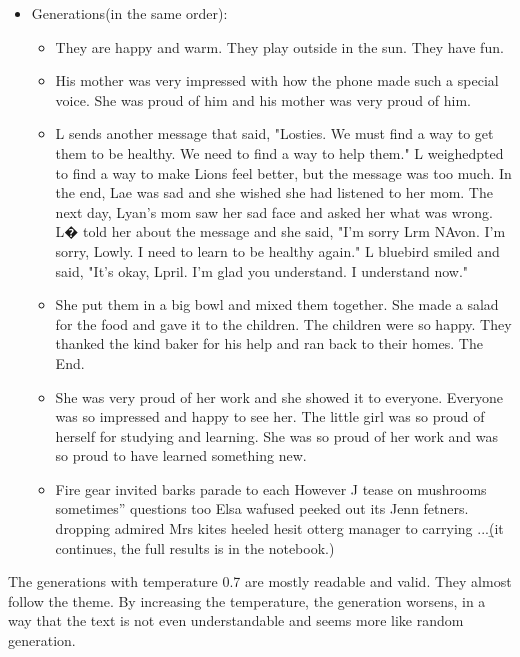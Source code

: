 \documentclass[11pt,a4paper]{article}
\begin{document}
\begin{itemize}
\item Generations(in the same order):
\begin{itemize} 
\item They are happy and warm. They play outside in the sun. They have fun.
\item His mother was very impressed with how the phone made such a special voice. She was proud of him and his mother was very proud of him.
\item  L sends another message that said, "Losties. We must find a way to get them to be healthy. We need to find a way to help them."
L weighedpted to find a way to make Lions feel better, but the message was too much. In the end, Lae was sad and she wished she had listened to her mom.
The next day, Lyan's mom saw her sad face and asked her what was wrong. L� told her about the message and she said, "I'm sorry Lrm NAvon. I'm sorry, Lowly. I need to learn to be healthy again."
L bluebird smiled and said, "It's okay, Lpril. I'm glad you understand. I understand now."
\item She put them in a big bowl and mixed them together. She made a salad for the food and gave it to the children.
The children were so happy. They thanked the kind baker for his help and ran back to their homes.
The End.
\item She was very proud of her work and she showed it to everyone. Everyone was so impressed and happy to see her.
The little girl was so proud of herself for studying and learning. She was so proud of her work and was so proud to have learned something new.
\item Fire gear invited barks parade to each However J tease on mushrooms sometimes” questions too Elsa wafused peeked out its Jenn fetners. dropping admired Mrs kites heeled hesit otterg manager to carrying ...\b{(it continues, the full results is in the notebook.)}
\end{itemize}
\end{itemize}
The generations with temperature 0.7 are mostly readable and valid. They almost follow the theme. By increasing the temperature, the generation worsens, in a way that the text is not even understandable and seems more like random generation.
\end{document}
